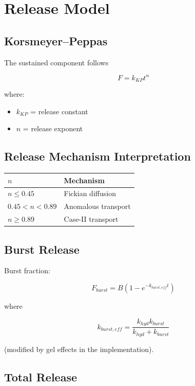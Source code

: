 \documentclass[11pt]{article}
\begin{document}
\section{Release Model}

\subsection{Korsmeyer--Peppas}

The sustained component follows

\begin{equation}
F=k_{KP}t^n
\end{equation}

where:

\begin{itemize}
\item $k_{KP}$ = release constant
\item $n$ = release exponent
\end{itemize}

\subsection{Release Mechanism Interpretation}

\begin{longtable}{ll}
\toprule
$n$ & Mechanism\\
\midrule
$n \le 0.45$ & Fickian diffusion\\
$0.45<n<0.89$ & Anomalous transport\\
$n\ge0.89$ & Case-II transport\\
\bottomrule
\end{longtable}

\subsection{Burst Release}

Burst fraction:

\begin{equation}
F_{burst}
=
B
\left(
1-e^{-k_{burst,eff}t}
\right)
\end{equation}

where

\begin{equation}
k_{burst,eff}
=
\frac{k_{hyd}k_{burst}}
{k_{hyd}+k_{burst}}
\end{equation}

(modified by gel effects in the implementation).

\subsection{Total Release}
\end{document}
